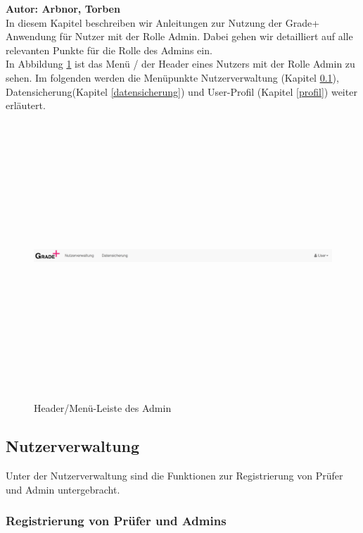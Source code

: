 \textbf{Autor: Arbnor, Torben} \\
In diesem Kapitel beschreiben wir Anleitungen zur Nutzung der Grade+ Anwendung für Nutzer mit der Rolle Admin. Dabei gehen wir detailliert auf alle relevanten Punkte für die Rolle des Admins ein.\\
In Abbildung \ref{fig 1} ist das Menü / der Header eines Nutzers mit der Rolle Admin zu sehen. 
Im folgenden werden die Menüpunkte Nutzerverwaltung (Kapitel  \ref{nutzerverwaltung}), Datensicherung(Kapitel  \ref{datensicherung}) und User-Profil (Kapitel  \ref{profil}) weiter erläutert.
\begin{figure}[H]
	\centering
	\caption{Header/Menü-Leiste des Admin}
  \includegraphics[width=\textwidth,height=10cm,keepaspectratio]{../screenshots/Admin/menu.png}
	\label{fig 1}
\end{figure}

\subsection{Nutzerverwaltung}
\label{nutzerverwaltung}
Unter der Nutzerverwaltung sind die Funktionen zur Registrierung von Prüfer und Admin untergebracht. 
\subsubsection{Registrierung von Prüfer und Admins}  \label{sec:regPuA}


